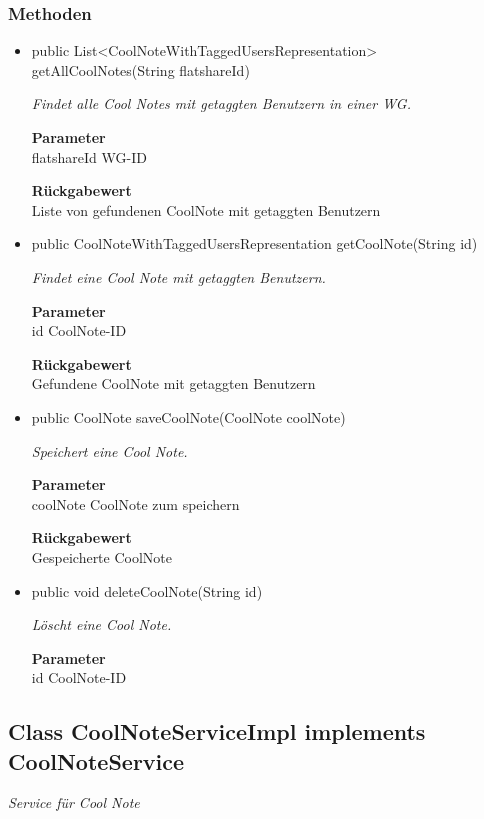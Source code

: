 \documentclass[a4paper]{scrreprt}
\begin{document}
        \subsubsection{Methoden}
        \begin{itemize}
        	\item{public List<CoolNoteWithTaggedUsersRepresentation> getAllCoolNotes(String flatshareId)}
        	
        	\textit{Findet alle Cool Notes mit getaggten Benutzern in einer WG.}
        	
        	\textbf{Parameter} \\
        	flatshareId WG-ID
        	
        	\textbf{Rückgabewert} \\
        	Liste von gefundenen CoolNote mit getaggten Benutzern        \item{public CoolNoteWithTaggedUsersRepresentation getCoolNote(String id)}
        	
        	\textit{Findet eine Cool Note mit getaggten Benutzern.}
        	
        	\textbf{Parameter} \\
        	id CoolNote-ID
        	
        	\textbf{Rückgabewert} \\
        	Gefundene CoolNote mit getaggten Benutzern        \item{public CoolNote saveCoolNote(CoolNote coolNote)}
        	
        	\textit{Speichert eine Cool Note.}
        	
        	\textbf{Parameter} \\
        	coolNote CoolNote zum speichern
        	
        	\textbf{Rückgabewert} \\
        	Gespeicherte CoolNote        \item{public void deleteCoolNote(String id)}
        	
        	\textit{Löscht eine Cool Note.}
        	
        	\textbf{Parameter} \\
        	id CoolNote-ID
        	
        	
        \end{itemize}
        \subsection{Class CoolNoteServiceImpl implements CoolNoteService}
        \textit{Service für Cool Note}
\end{document}
